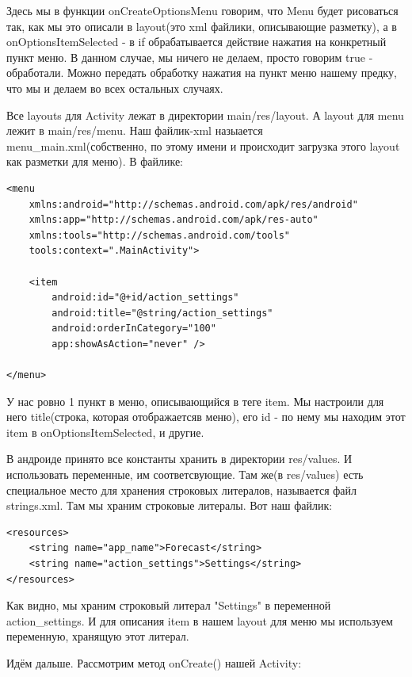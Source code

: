 \documentclass[12 pt]{article}
\begin{document}
    Здесь мы в функции onCreateOptionsMenu говорим, что Menu будет рисоваться так, как мы это описали в layout(это xml файлики, описывающие разметку), а в onOptionsItemSelected - в if обрабатывается действие нажатия на конкретный пункт меню. В данном случае, мы ничего не делаем, просто говорим true - обработали. Можно передать обработку нажатия на пункт меню нашему предку, что мы и делаем во всех остальных случаях.
    
    Все layouts для Activity лежат в директории main/res/layout. А layout для menu лежит в main/res/menu. Наш файлик-xml назыается menu\_main.xml(собственно, по этому имени и происходит загрузка этого layout как разметки для меню). В файлике:
    
    \begin{lstlisting}
<menu
    xmlns:android="http://schemas.android.com/apk/res/android"
    xmlns:app="http://schemas.android.com/apk/res-auto"
    xmlns:tools="http://schemas.android.com/tools"
    tools:context=".MainActivity">

    <item
        android:id="@+id/action_settings"
        android:title="@string/action_settings"
        android:orderInCategory="100"
        app:showAsAction="never" />

</menu>    
    \end{lstlisting}
    
    У нас ровно 1 пункт в меню, описывающийся в теге item. Мы настроили для него title(строка, которая отображаетсяв меню), его id - по нему мы находим этот item в onOptionsItemSelected, и другие.
    
    В андроиде принято все константы хранить в директории res/values. И использовать переменные, им соответсвующие. Там же(в res/values) есть специальное место для хранения строковых литералов, называется файл strings.xml. Там мы храним строковые литералы. Вот наш файлик:
    
    \begin{lstlisting}
<resources>
    <string name="app_name">Forecast</string>
    <string name="action_settings">Settings</string>
</resources>   
    \end{lstlisting}
    
    Как видно, мы храним строковый литерал "Settings" в переменной action\_settings. И для описания item в нашем layout для меню мы используем переменную, хранящую этот литерал.
    
    Идём дальше. Рассмотрим метод onCreate() нашей Activity:
    
\end{document}
